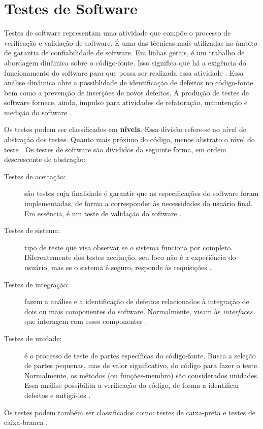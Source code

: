 \section{Testes de Software}
Testes de software representam uma atividade que compõe o processo de
verificação e validação de software. É uma das técnicas mais utilizadas no
âmbito de garantia de confiabilidade de software. Em linhas gerais, é um
trabalho de abordagem dinâmica sobre o código-fonte. Isso significa que há a
exigência do funcionamento do software para que possa ser realizada essa
atividade \cite{barbosaEtAl2009}. Essa análise dinâmica abre a possiblidade de
identificação de defeitos no código-fonte, bem como a prevenção de inserções de
novos defeitos. A produção de testes de software fornece, ainda, impulso para
atividades de refatoração, manutenção e medição do software
\cite{barbosaEtAl2009}.
\par
\indent Os testes podem ser classificados em \textbf{níveis}. Essa divisão
refere-se ao nível de abstração dos testes. Quanto mais próximo do código,
menos abstrato o nível do teste \cite{sommerville2007}. Os testes de software
são divididos da seguinte forma, em ordem descrescente de abstração:
\begin{description}
\item[Testes de aceitação:] são testes cuja finalidade é garantir que as
especificações do software foram implementadas, de forma a corresponder às
necessidades do usuário final. Em essência, é um teste de validação do software
\cite{sommerville2007}.
\item[Testes de sistema:] tipo de teste que visa observar se o sistema funciona
por completo. Diferentemente dos testes aceitação, seu foco não é a experiência
do usuário, mas se o sistema é seguro, responde às requisições
\cite{sommerville2007}.
\item[Testes de integração:] fazem a análise e a identificação de defeitos
relacionados à integração de dois ou mais componentes do software. Normalmente,
visam às \textit{interfaces} que interagem com esses componentes
\cite{sommerville2007}.
\item[Testes de unidade:] é o processo de teste de partes específicas do
código-fonte. Busca a seleção de partes pequenas, mas de valor significativo,
do código para fazer o teste. Normalmente, os métodos (ou funções-membro) são
considerados unidades. Essa análise possibilita a verificação do código, de
forma a identificar defeitos e mitigá-los \cite{sommerville2007}.
\end{description}
\par
\indent Os testes podem também ser classificados como: testes de caixa-preta e
testes de caixa-branca \cite{barbosaEtAl2009}.

